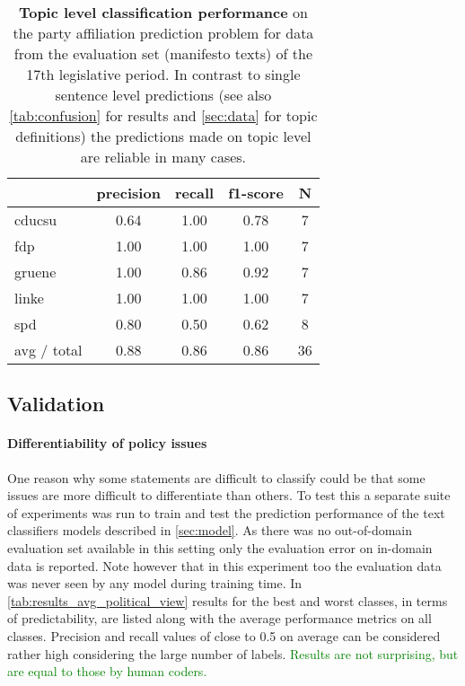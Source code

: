 \documentclass[11pt]{article}
\newcommand{\felix}[1]{\textcolor{green}{#1}}
\begin{document}
\begin{table}[t]
\caption{
\label{tab:results_topic}
{\bf Topic level classification performance} on the party affiliation prediction problem for data from the evaluation set (manifesto texts) of the 17th legislative period. In contrast to single sentence level predictions (see  also \autoref{tab:confusion} for results and \autoref{sec:data} for topic definitions) the predictions made on topic level are reliable in many cases.}
\begin{center}
\begin{tabular}{lcccc}
    &         precision    &recall &  f1-score  & N  \\
    \hline
        \hline
cducsu     &  0.64  &    1.00  &    0.78    &     7\\
       fdp    &   1.00    &  1.00    &  1.00    &     7\\
    gruene  &     1.00  &    0.86  &    0.92    &     7\\
     linke    &   1.00   &   1.00     & 1.00    &     7\\
       spd   &    0.80   &   0.50    &  0.62     &    8\\
    \hline
    avg / total  &     0.88   &   0.86   &   0.86  &      36\\
\end{tabular}
\end{center}

\end{table}

\subsection{Validation}
\paragraph{Differentiability of policy issues}
One reason why some statements are difficult to classify could be that some issues are more difficult to differentiate than others. To test this a separate suite of experiments was run to train and test the prediction performance of the text classifiers models described in \autoref{sec:model}. As there was no out-of-domain evaluation set available in this setting only the evaluation error on in-domain data is reported. Note however that in this experiment too the evaluation data was never seen by any model during training time.
In \autoref{tab:results_avg_political_view} results for the best and worst classes, in terms of predictability, are listed along with the average performance metrics on all classes.
Precision and recall values of close to 0.5 on average can be considered rather high considering the large number of labels. \felix{Results are not surprising, but are equal to those by human coders.} \\
\end{document}
